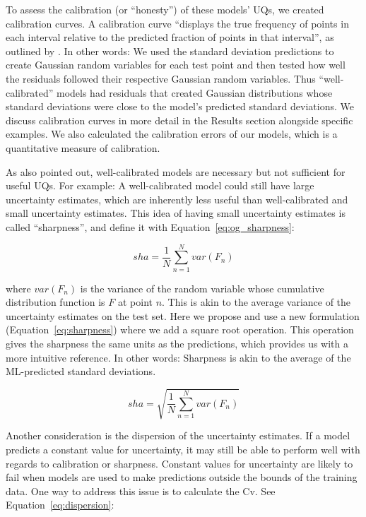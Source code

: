 \documentclass[]{achemso}
\begin{document}
To assess the calibration (or ``honesty'') of these models' \gls{UQ}s, we created calibration curves.
A calibration curve ``displays the true frequency of points in each interval relative to the predicted fraction of points in that interval'', as outlined by \citet{Kuleshov2018}.
In other words:  We used the standard deviation predictions to create Gaussian random variables for each test point and then tested how well the residuals followed their respective Gaussian random variables.
Thus ``well-calibrated'' models had residuals that created Gaussian distributions whose standard deviations were close to the model's predicted standard deviations.
We discuss calibration curves in more detail in the Results section alongside specific examples.
We also calculated the calibration errors\cite{Kuleshov2018} of our models, which is a quantitative measure of calibration.

As \citet{Kuleshov2018} also pointed out, well-calibrated models are necessary but not sufficient for useful \gls{UQ}s.
For example:  A well-calibrated model could still have large uncertainty estimates, which are inherently less useful than well-calibrated and small uncertainty estimates.
This idea of having small uncertainty estimates is called ``sharpness'', and \citet{Kuleshov2018} define it with Equation~\ref{eq:og_sharpness}:

\begin{equation}\label{eq:og_sharpness}
    sha = \frac{1}{N} \sum_{n=1}^{N} var(F_n)
\end{equation}

\noindent where $var(F_n)$ is the variance of the random variable whose cumulative distribution function is $F$ at point $n$.
This is akin to the average variance of the uncertainty estimates on the test set.
Here we propose and use a new formulation (Equation~\ref{eq:sharpness}) where we add a square root operation.
This operation gives the sharpness the same units as the predictions, which provides us with a more intuitive reference.
In other words:  Sharpness is akin to the average of the \gls{ML}-predicted standard deviations.

\begin{equation}\label{eq:sharpness}
    sha = \sqrt{\frac{1}{N} \sum_{n=1}^{N} var(F_n)}
\end{equation}

Another consideration is the dispersion of the uncertainty estimates.
If a model predicts a constant value for uncertainty, it may still be able to perform well with regards to calibration or sharpness.
Constant values for uncertainty are likely to fail when models are used to make predictions outside the bounds of the training data.
One way to address this issue is to calculate the \gls{Cv}\cite{Levi2020}.
See Equation~\ref{eq:dispersion}:
\end{document}
